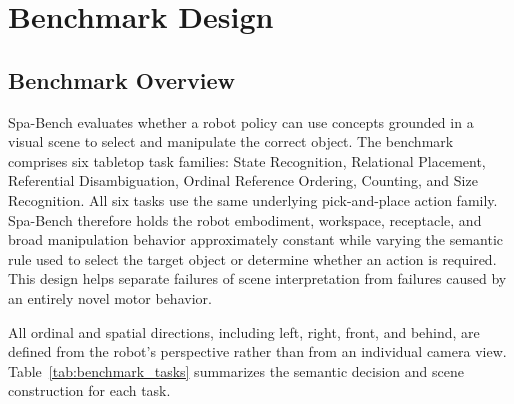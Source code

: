 
\section{Benchmark Design}
\label{sec:benchmark_design}

\subsection{Benchmark Overview}

Spa-Bench evaluates whether a robot policy can use concepts grounded in a visual scene to select and manipulate the correct object. The benchmark comprises six tabletop task families: State Recognition, Relational Placement, Referential Disambiguation, Ordinal Reference Ordering, Counting, and Size Recognition. All six tasks use the same underlying pick-and-place action family. Spa-Bench therefore holds the robot embodiment, workspace, receptacle, and broad manipulation behavior approximately constant while varying the semantic rule used to select the target object or determine whether an action is required. This design helps separate failures of scene interpretation from failures caused by an entirely novel motor behavior.

All ordinal and spatial directions, including left, right, front, and behind, are defined from the robot's perspective rather than from an individual camera view. Table~\ref{tab:benchmark_tasks} summarizes the semantic decision and scene construction for each task.

